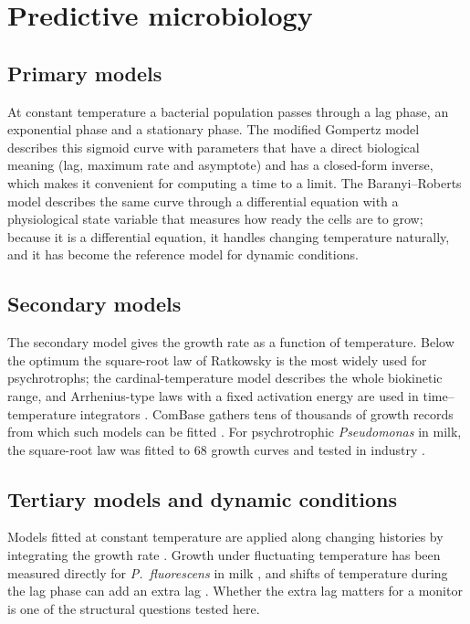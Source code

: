 \documentclass[11pt,a4paper,twoside,openany]{book}
\theoremstyle{plain}\newtheorem{proposition}{Proposition}\newtheorem{corollary}{Corollary}
\theoremstyle{definition}\newtheorem{definition}{Definition}[chapter]
\begin{document}
\section{Predictive microbiology}
\subsection{Primary models}
At constant temperature a bacterial population passes through a lag phase, an exponential phase and a stationary phase. The modified Gompertz model \cite{gompertz1825,zwietering1990} describes this sigmoid curve with parameters that have a direct biological meaning (lag, maximum rate and asymptote) and has a closed-form inverse, which makes it convenient for computing a time to a limit. The Baranyi--Roberts model \cite{baranyi1993,baranyi1994} describes the same curve through a differential equation with a physiological state variable that measures how ready the cells are to grow; because it is a differential equation, it handles changing temperature naturally, and it has become the reference model for dynamic conditions.

\subsection{Secondary models}
The secondary model gives the growth rate as a function of temperature. Below the optimum the square-root law of Ratkowsky \cite{ratkowsky1982} is the most widely used for psychrotrophs; the cardinal-temperature model \cite{rosso1993} describes the whole biokinetic range, and Arrhenius-type laws with a fixed activation energy are used in time--temperature integrators \cite{taoukis1989}. ComBase gathers tens of thousands of growth records from which such models can be fitted \cite{baranyi2004,combase}. For psychrotrophic \textit{Pseudomonas} in milk, the square-root law was fitted to 68 growth curves and tested in industry \cite{neumeyer1995,neumeyer1997a}.

\subsection{Tertiary models and dynamic conditions}
Models fitted at constant temperature are applied along changing histories by integrating the growth rate \cite{corradini2005}. Growth under fluctuating temperature has been measured directly for \textit{P.~fluorescens} in milk \cite{lin2016}, and shifts of temperature during the lag phase can add an extra lag \cite{zwietering1994}. Whether the extra lag matters for a monitor is one of the structural questions tested here.
\end{document}
